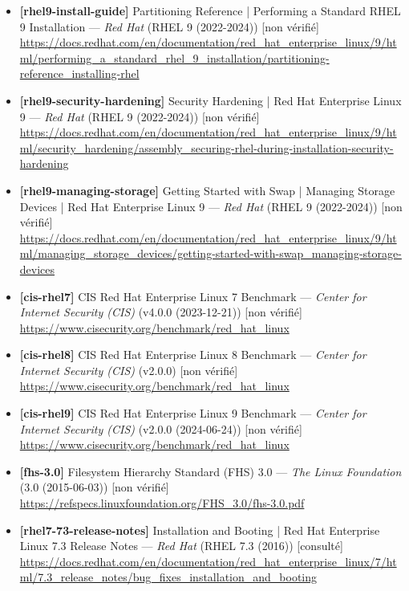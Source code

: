 \documentclass[10pt,a4paper]{article}
\begin{document}
\begin{itemize}[leftmargin=1.6em]
\item \textbf{[rhel9-install-guide]} Partitioning Reference | Performing a Standard RHEL 9 Installation --- \textit{Red Hat} (RHEL 9 (2022-2024)) \textcolor{cMed}{[non v\'erifi\'e]}\\ \url{https://docs.redhat.com/en/documentation/red_hat_enterprise_linux/9/html/performing_a_standard_rhel_9_installation/partitioning-reference_installing-rhel}
\item \textbf{[rhel9-security-hardening]} Security Hardening | Red Hat Enterprise Linux 9 --- \textit{Red Hat} (RHEL 9 (2022-2024)) \textcolor{cMed}{[non v\'erifi\'e]}\\ \url{https://docs.redhat.com/en/documentation/red_hat_enterprise_linux/9/html/security_hardening/assembly_securing-rhel-during-installation-security-hardening}
\item \textbf{[rhel9-managing-storage]} Getting Started with Swap | Managing Storage Devices | Red Hat Enterprise Linux 9 --- \textit{Red Hat} (RHEL 9 (2022-2024)) \textcolor{cMed}{[non v\'erifi\'e]}\\ \url{https://docs.redhat.com/en/documentation/red_hat_enterprise_linux/9/html/managing_storage_devices/getting-started-with-swap_managing-storage-devices}
\item \textbf{[cis-rhel7]} CIS Red Hat Enterprise Linux 7 Benchmark --- \textit{Center for Internet Security (CIS)} (v4.0.0 (2023-12-21)) \textcolor{cMed}{[non v\'erifi\'e]}\\ \url{https://www.cisecurity.org/benchmark/red_hat_linux}
\item \textbf{[cis-rhel8]} CIS Red Hat Enterprise Linux 8 Benchmark --- \textit{Center for Internet Security (CIS)} (v2.0.0) \textcolor{cMed}{[non v\'erifi\'e]}\\ \url{https://www.cisecurity.org/benchmark/red_hat_linux}
\item \textbf{[cis-rhel9]} CIS Red Hat Enterprise Linux 9 Benchmark --- \textit{Center for Internet Security (CIS)} (v2.0.0 (2024-06-24)) \textcolor{cMed}{[non v\'erifi\'e]}\\ \url{https://www.cisecurity.org/benchmark/red_hat_linux}
\item \textbf{[fhs-3.0]} Filesystem Hierarchy Standard (FHS) 3.0 --- \textit{The Linux Foundation} (3.0 (2015-06-03)) \textcolor{cMed}{[non v\'erifi\'e]}\\ \url{https://refspecs.linuxfoundation.org/FHS_3.0/fhs-3.0.pdf}
\item \textbf{[rhel7-73-release-notes]} Installation and Booting | Red Hat Enterprise Linux 7.3 Release Notes --- \textit{Red Hat} (RHEL 7.3 (2016)) \textcolor{cOk}{[consult\'e]}\\ \url{https://docs.redhat.com/en/documentation/red_hat_enterprise_linux/7/html/7.3_release_notes/bug_fixes_installation_and_booting}

\end{itemize}
\end{document}
